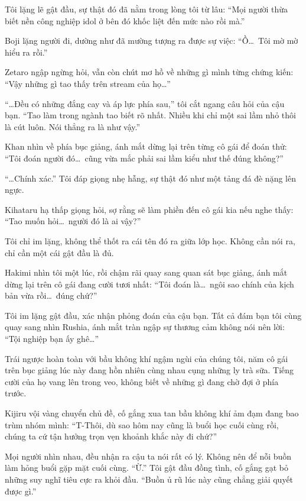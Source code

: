 \documentclass[../main.tex]{subfiles}
\begin{document}
Tôi lặng lẽ gật đầu, sự thật đó đã nằm trong lòng tôi từ lâu: ``Mọi người thừa biết nền công nghiệp idol ở bên đó khốc liệt đến mức nào rồi mà.''

Boji lặng người đi, dường như đã mường tượng ra được sự việc: ``Ồ\dots\ Tôi mờ mờ hiểu ra rồi.''

Zetaro ngập ngừng hỏi, vẫn còn chút mơ hồ về những gì mình từng chứng kiến: ``Vậy những gì tao thấy trên stream của họ\dots''

``\dots Đều có những đắng cay và áp lực phía sau,'' tôi cắt ngang câu hỏi của cậu bạn. ``Tao làm trong ngành tao biết rõ nhất. Nhiều khi chỉ một sai lầm nhỏ thôi là cút luôn. Nói thẳng ra là như vậy.''

Khan nhìn về phía bục giảng, ánh mắt dừng lại trên từng cô gái để đoán thử: ``Tôi đoán người đó\dots\ cũng vừa mắc phải sai lầm kiểu như thế đúng không?''

``\dots Chính xác.'' Tôi đáp giọng nhẹ hẫng, sự thật đó như một tảng đá đè nặng lên ngực.

Kihataru hạ thấp giọng hỏi, sợ rằng sẽ làm phiền đến cô gái kia nếu nghe thấy: ``Tao muốn hỏi\dots\ người đó là ai vậy?''

Tôi chỉ im lặng, không thể thốt ra cái tên đó ra giữa lớp học. Không cần nói ra, chỉ cần một cái gật đầu là đủ.

Hakimi nhìn tôi một lúc, rồi chậm rãi quay sang quan sát bục giảng, ánh mắt dừng lại trên cô gái đang cười tươi nhất: ``Tôi đoán là\dots\ ngôi sao chính của kịch bản vừa rồi\dots\ đúng chứ?''

Tôi im lặng gật đầu, xác nhận phỏng đoán của cậu bạn. Tất cả đám bạn tôi cùng quay sang nhìn Rushia, ánh mắt tràn ngập sự thương cảm không nói nên lời: ``Tội nghiệp bạn ấy ghê\dots''

Trái ngược hoàn toàn với bầu không khí ngậm ngùi của chúng tôi, năm cô gái trên bục giảng lúc này đang hồn nhiên cùng nhau cụng những ly trà sữa. Tiếng cười của họ vang lên trong veo, không biết về những gì đang chờ đợi ở phía trước.

Kijiru vội vàng chuyển chủ đề, cố gắng xua tan bầu không khí ảm đạm đang bao trùm nhóm mình: ``T-Thôi, dù sao hôm nay cũng là buổi học cuối cùng rồi, chúng ta cứ tận hưởng trọn vẹn khoảnh khắc này đi chứ?''

Mọi người nhìn nhau, đều nhận ra cậu ta nói rất có lý. Không nên để nỗi buồn làm hỏng buổi gặp mặt cuối cùng. ``Ừ.'' Tôi gật đầu đồng tình, cố gắng gạt bỏ những suy nghĩ tiêu cực ra khỏi đầu. ``Buồn ủ rũ lúc này cũng chẳng giải quyết được gì.''
\end{document}
